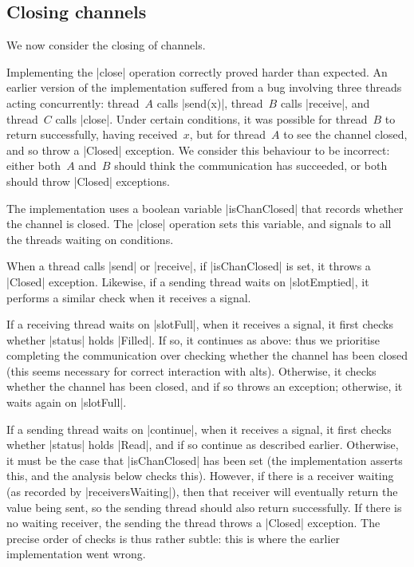 \subsection{Closing channels}

\inlineScala

We now consider the closing of channels.  

Implementing the |close| operation correctly proved harder than expected.  An
earlier version of the implementation suffered from a bug involving three
threads acting concurrently: thread~$A$ calls |send(x)|, thread~$B$ calls
|receive|, and thread~$C$ calls |close|.  Under certain conditions, it was
possible for thread~$B$ to return successfully, having received~$x$, but for
thread~$A$ to see the channel closed, and so throw a |Closed| exception.  We
consider this behaviour to be incorrect: either both~$A$ and~$B$ should think
the communication has succeeded, or both should throw |Closed| exceptions.


The implementation uses a boolean variable |isChanClosed| that records whether
the channel is closed.  The |close| operation sets this variable, and signals
to all the threads waiting on conditions.

When a thread calls |send| or |receive|, if |isChanClosed| is set, it throws a
|Closed| exception.  Likewise, if a sending thread waits on |slotEmptied|, it
performs a similar check when it receives a signal.  

If a receiving thread waits on |slotFull|, when it receives a signal, it first
checks whether |status| holds |Filled|.  If so, it continues as above: thus we
prioritise completing the communication over checking whether the channel has
been closed (this seems necessary for correct interaction with alts).
Otherwise, it checks whether the channel has been closed, and if so throws an
exception; otherwise, it waits again on |slotFull|.

If a sending thread waits on |continue|, when it receives a signal, it 
first checks whether |status| holds |Read|, and if so continue as described
earlier.  Otherwise, it must be the case that |isChanClosed| has been set (the
implementation asserts this, and the analysis below checks this).  However, if
there is a receiver waiting (as recorded by |receiversWaiting|), then that
receiver will eventually return the value being sent, so the sending thread
should also return successfully.  If there is no waiting receiver, the sending
the thread throws a |Closed| exception.  The precise order of checks is thus
rather subtle: this is where the earlier implementation went wrong.

